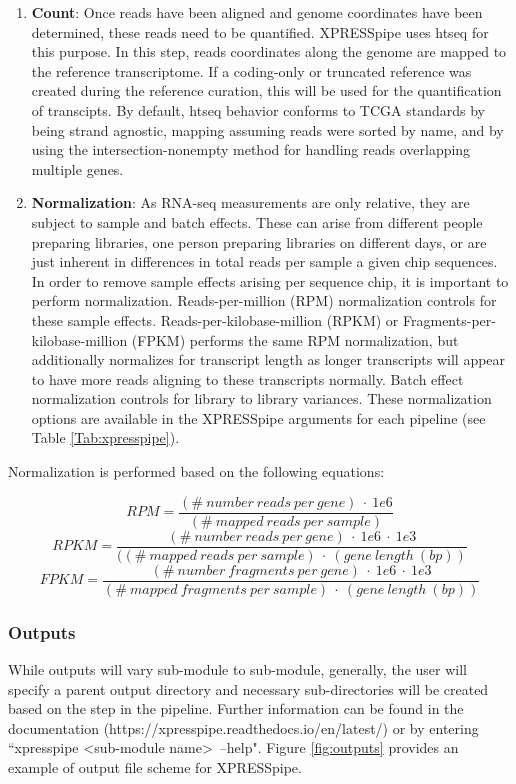 \documentclass[11pt, a4paper, oneside]{article}
\begin{document}
\begin{enumerate}
  \item \textbf{Count}: Once reads have been aligned and genome coordinates have been determined, these reads need to be quantified. XPRESSpipe uses htseq{} for this purpose. In this step, reads coordinates along the genome are mapped to the reference transcriptome. If a coding-only or truncated reference was created during the reference curation, this will be used for the quantification of transcipts. By default, htseq behavior conforms to TCGA standards by being strand agnostic, mapping assuming reads were sorted by name, and by using the intersection-nonempty method for handling reads overlapping multiple genes.
  \item \textbf{Normalization}: As RNA-seq measurements are only relative, they are subject to sample and batch effects. These can arise from different people preparing libraries, one person preparing libraries on different days, or are just inherent in differences in total reads per sample a given chip sequences. In order to remove sample effects arising per sequence chip, it is important to perform normalization. Reads-per-million (RPM) normalization controls for these sample effects. Reads-per-kilobase-million (RPKM) or Fragments-per-kilobase-million (FPKM) performs the same RPM normalization, but additionally normalizes for transcript length as longer transcripts will appear to have more reads aligning to these transcripts normally. Batch effect normalization controls for library to library variances. These normalization options are available in the XPRESSpipe arguments for each pipeline (see Table \ref{Tab:xpresspipe}).
\end{enumerate}

Normalization is performed based on the following equations:

\[ RPM = \frac{(\#\ number\ reads\ per\ gene)\ \cdot\ 1e6}{(\#\ mapped\ reads\ per\ sample)} \]
\[ RPKM = \frac{(\#\ number\ reads\ per\ gene)\ \cdot\ 1e6\ \cdot\ 1e3}{((\#\ mapped\ reads\ per\ sample)\ \cdot\ (gene\ length\ (bp))} \]
\[ FPKM = \frac{(\#\ number\ fragments\ per\ gene)\ \cdot\ 1e6\ \cdot\ 1e3}{(\#\ mapped\ fragments\ per\ sample)\ \cdot\ (gene\ length\ (bp))} \]

\subsubsection{Outputs}
While outputs will vary sub-module to sub-module, generally, the user will specify a parent output directory and necessary sub-directories will be created based on the step in the pipeline. Further information can be found in the documentation (https://xpresspipe.readthedocs.io/en/latest/) or by entering ``xpresspipe \textless sub-module name\textgreater \ --help". Figure \ref{fig:outputs} provides an example of output file scheme for XPRESSpipe.
\end{document}
